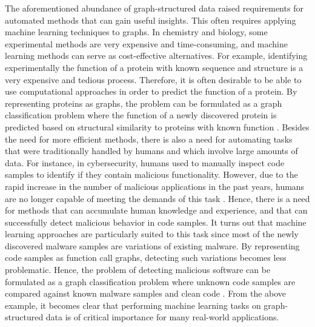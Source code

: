 \documentclass[twoside,11pt]{article}
\begin{document}
The aforementioned abundance of graph-structured data raised requirements for automated methods that can gain useful insights.
This often requires applying machine learning techniques to graphs.
In chemistry and biology, some experimental methods are very expensive and time-consuming, and machine learning methods can serve as cost-effective alternatives.
For example, identifying experimentally the function of a protein with known sequence and structure is a very expensive and tedious process.
Therefore, it is often desirable to be able to use computational approaches in order to predict the function of a protein.
By representing proteins as graphs, the problem can be formulated as a graph classification problem where the function of a newly discovered protein is predicted based on structural similarity to proteins with known function .
Besides the need for more efficient methods, there is also a need for automating tasks that were traditionally handled by humans and which involve large amounts of data.
For instance, in cybersecurity, humans used to manually inspect code samples to identify if they contain malicious functionality.
However, due to the rapid increase in the number of malicious applications in the past years, humans are no longer capable of meeting the demands of this task .
Hence, there is a need for methods that can accumulate human knowledge and experience, and that can successfully detect malicious behavior in code samples.
It turns out that machine learning approaches are particularly suited to this task since most of the newly discovered malware samples are variations of existing malware.
By representing code samples as function call graphs, detecting such variations becomes less problematic.
Hence, the problem of detecting malicious software can be formulated as a graph classification problem where unknown code samples are compared against known malware samples and clean code .
From the above example, it becomes clear that performing machine learning tasks on graph-structured data is of critical importance for many real-world applications. 
\end{document}
